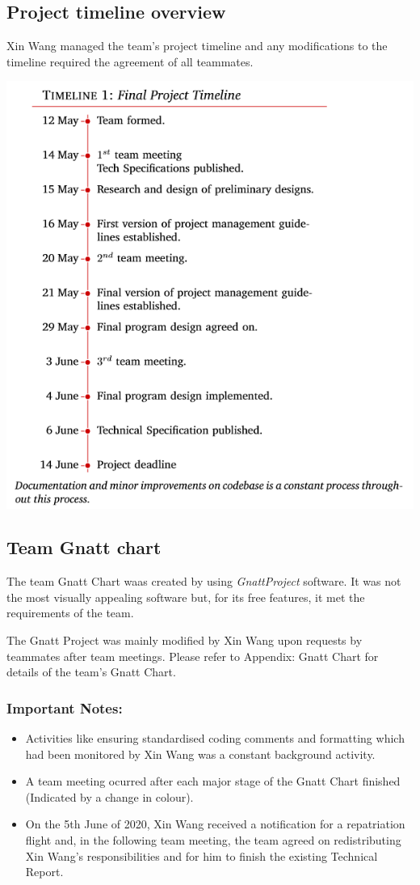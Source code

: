 \documentclass[12pt,a4paper]{article}
\begin{document}
	\subsection{Project timeline overview}
	Xin Wang managed the team's project timeline and any modifications to the timeline required the agreement of all
	teammates. \par
	\includegraphics{Timeline.PNG}
	\pagebreak

	\subsection{Team Gnatt chart}
	The team Gnatt Chart waas created by using \textit{GnattProject} software. It was not the most 
	visually appealing software but, for its free features, it met the requirements of the team. \par
	The Gnatt Project was mainly modified by Xin Wang upon requests by teammates after team meetings. Please
	refer to Appendix: Gnatt Chart for details of the team's Gnatt Chart. \par
	\subsubsection{Important Notes:}
	\begin{itemize}
		\item Activities like ensuring standardised coding comments and formatting which had been monitored by 
		Xin Wang was a constant background activity. 
		\item A team meeting ocurred after each major stage of the Gnatt Chart finished (Indicated by 
		a change in colour).
		\item On the 5th June of 2020, Xin Wang received a notification for a repatriation flight
		and, in the following team meeting, the team agreed on redistributing Xin Wang's responsibilities
		and for him to finish the existing Technical Report.
	\end{itemize}
	\pagebreak
\end{document}

